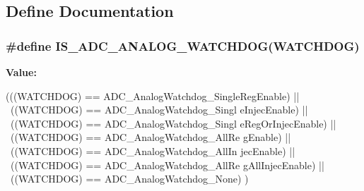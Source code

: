 \subsection{Define Documentation}
\hypertarget{group__ADC__analog__watchdog__selection_ga53ffa30f756569194342bfba80165544}{
\subsubsection[{IS\_\-ADC\_\-ANALOG\_\-WATCHDOG}]{\setlength{\rightskip}{0pt plus 5cm}\#define IS\_\-ADC\_\-ANALOG\_\-WATCHDOG(WATCHDOG)}}
\label{group__ADC__analog__watchdog__selection_ga53ffa30f756569194342bfba80165544}
{\bfseries Value:}
\begin{DoxyCode}
(((WATCHDOG) == ADC_AnalogWatchdog_SingleRegEnable) || \
                                          ((WATCHDOG) == ADC_AnalogWatchdog_Singl
      eInjecEnable) || \
                                          ((WATCHDOG) == ADC_AnalogWatchdog_Singl
      eRegOrInjecEnable) || \
                                          ((WATCHDOG) == ADC_AnalogWatchdog_AllRe
      gEnable) || \
                                          ((WATCHDOG) == ADC_AnalogWatchdog_AllIn
      jecEnable) || \
                                          ((WATCHDOG) == ADC_AnalogWatchdog_AllRe
      gAllInjecEnable) || \
                                          ((WATCHDOG) == ADC_AnalogWatchdog_None)
      )
\end{DoxyCode}
